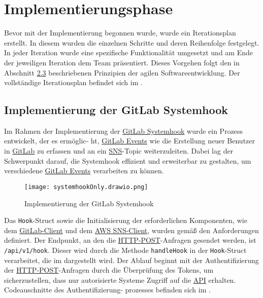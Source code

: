 \section{Implementierungsphase} 
\label{sec:Implementierungsphase}

Bevor mit der Implementierung begonnen wurde, wurde ein Iterationsplan erstellt. In diesem wurden die einzelnen Schritte und deren Reihenfolge festgelegt. In jeder Iteration wurde eine spezifische Funktionalität umgesetzt und am Ende der jeweiligen Iteration dem Team präsentiert. Dieses Vorgehen folgt den in Abschnitt \hyperlink{agil}{2.3} beschriebenen Prinzipien der agilen Softwareentwicklung. Der vollständige Iterationsplan befindet sich im .

\subsection{Implementierung der GitLab Systemhook}
\label{sec:ImplementierungGitlabSystemhook}

Im Rahmen der Implementierung der \hyperlink{GitLab}{\textcolor{AOBlau}{GitLab Systemhook}} wurde ein Prozess entwickelt, der es ermöglic-
ht, \hyperlink{GitLabEvent}{\textcolor{AOBlau}{GitLab Events}} wie die Erstellung neuer Benutzer in \hyperlink{GitLab}{\textcolor{AOBlau}{GitLab}} zu erfassen und an ein \hyperlink{SNS}{\textcolor{AOBlau}{SNS}}-Topic weiterzuleiten. Dabei lag der Schwerpunkt darauf, die Systemhook effizient und erweiterbar zu gestalten, um verschiedene \hyperlink{GitLabEvent}{\textcolor{AOBlau}{GitLab Events}} verarbeiten zu können.

\begin{figure}[htb]
    \centering
    \texttt{[image: systemhookOnly.drawio.png]}
    \caption{Implementierung der GitLab Systemhook}
\end{figure}

Das \texttt{Hook}-Struct sowie die Initialisierung der erforderlichen Komponenten, wie dem \hyperlink{GitLabClient}{\textcolor{AOBlau}{GitLab-Client}} und dem \hyperlink{SNSClient}{\textcolor{AOBlau}{AWS SNS-Client}}, wurden gemäß den Anforderungen definiert. Der Endpunkt, an den die \hyperlink{HTTPPOST}{\textcolor{AOBlau}{HTTP-POST}}-Anfragen gesendet werden, ist \texttt{/api/v1/hook}. Dieser wird durch die Methode \texttt{handleHook} in der \texttt{Hook}-Struct verarbeitet, die im  dargestellt wird. Der Ablauf beginnt mit der Authentifizierung der \hyperlink{HTTP}{\textcolor{AOBlau}{HTTP-POST}}-Anfragen durch die Überprüfung des Tokens, um sicherzustellen, dass nur autorisierte Systeme Zugriff auf die \hyperlink{API}{\textcolor{AOBlau}{API}} erhalten. Codeauschnitte des Authentifizierung- prozesses befinden sich im .

